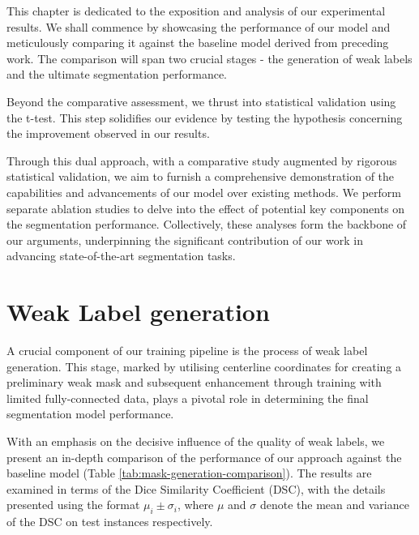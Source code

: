 This chapter is dedicated to the exposition and analysis of our experimental results. We shall commence by showcasing the performance of our model and meticulously comparing it against the baseline model derived from preceding work. The comparison will span two crucial stages - the generation of weak labels and the ultimate segmentation performance.

Beyond the comparative assessment, we thrust into statistical validation using the t-test. This step solidifies our evidence by testing the hypothesis concerning the improvement observed in our results.

Through this dual approach, with a comparative study augmented by rigorous statistical validation, we aim to furnish a comprehensive demonstration of the capabilities and advancements of our model over existing methods. We perform separate ablation studies to delve into the effect of potential key components on the segmentation performance. Collectively, these analyses form the backbone of our arguments, underpinning the significant contribution of our work in advancing state-of-the-art segmentation tasks.

\section{Weak Label generation}

A crucial component of our training pipeline is the process of weak label generation. This stage, marked by utilising centerline coordinates for creating a preliminary weak mask and subsequent enhancement through training with limited fully-connected data, plays a pivotal role in determining the final segmentation model performance.

With an emphasis on the decisive influence of the quality of weak labels, we present an in-depth comparison of the performance of our approach against the baseline model (Table \ref{tab:mask-generation-comparison}). The results are examined in terms of the Dice Similarity Coefficient (DSC), with the details presented using the format \(\mu_i \pm \sigma_{i}\), where \(\mu\) and \(\sigma\) denote the mean and variance of the DSC on test instances respectively.

